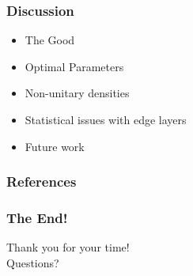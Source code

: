 \documentclass[11pt,aspectratio=169]{beamer}
\begin{document}


    \begin{frame}
        \frametitle{Discussion}
        \begin{itemize}
            \item The Good \vspace{1cm}
            \item Optimal Parameters \vspace{1cm}
            \item Non-unitary densities \vspace{1cm}
            \item Statistical issues with edge layers \vspace{1cm}
            \item Future work
        \end{itemize}

    \end{frame}


    \begin{frame}
        \frametitle{References}
        
        {\footnotesize }
    \end{frame}

    \begin{frame}
        \frametitle{The End!}
        \begin{center}
            \LARGE{Thank you for your time!} \\
            \LARGE{Questions?}
        \end{center}
    \end{frame}
\end{document}
